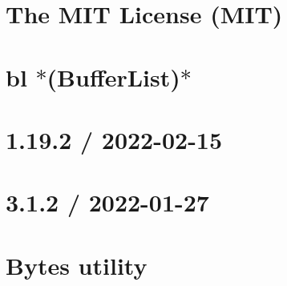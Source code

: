 \documentclass[twoside]{book}
\newcommand{\+}{\discretionary{\mbox{\scriptsize$\hookleftarrow$}}{}{}}
\begin{document}
\chapter{The MIT License (MIT)}
\label{md__c___users_vaishnavi_jadhav__desktop__developer_code_mean_stack_example_client_node_modules_bl__l_i_c_e_n_s_e}

\chapter{bl $\ast$(Buffer\+List)$\ast$}
\label{md__c___users_vaishnavi_jadhav__desktop__developer_code_mean_stack_example_client_node_modules_bl__r_e_a_d_m_e}

\chapter{1.19.2 / 2022-\/02-\/15}
\label{md__c___users_vaishnavi_jadhav__desktop__developer_code_mean_stack_example_client_node_modules_body_parser__h_i_s_t_o_r_y}

\chapter{3.1.2 / 2022-\/01-\/27}
\label{md__c___users_vaishnavi_jadhav__desktop__developer_code_mean_stack_example_client_node_modules_b91ca37d8d91f4e1e933f79c55e962c4f}

\chapter{Bytes utility}
\label{md__c___users_vaishnavi_jadhav__desktop__developer_code_mean_stack_example_client_node_modules_b591cd3ad06194beca8c54396b0fb41be}

\end{document}
